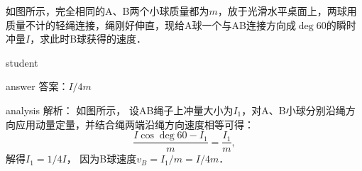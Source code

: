  \begin{example}
 	如图所示，完全相同的A、B两个小球质量都为$ m $，放于光滑水平桌面上，两球用质量不计的轻绳连接，绳刚好伸直，现给A球一个与AB连接方向成$ \deg{60} $的瞬时冲量$ I $，求此时B球获得的速度．
 	
 	
 	\begin{taggedblock}{student}
 		\vspace*{2cm}
 	\end{taggedblock}
 	
 	
 	\begin{taggedblock}{answer}
 		答案：$ I/4m $
 	\end{taggedblock}
 	
 	
 	\begin{taggedblock}{analysis}
 		解析：	如图所示，	设AB绳子上冲量大小为$ I_1 $，对A、B小球分别沿绳方向应用动量定量，并结合绳两端沿绳方向速度相等可得：
 		\[
 		\frac{I\cos\deg{60}-I_1}{m} = \frac{I_1}{m},
 		\]
 		解得$I_1=1/4 I$，	因为B球速度$ v_B=I_1/m=I/4m $．
 		

\end{taggedblock}
\end{example}
